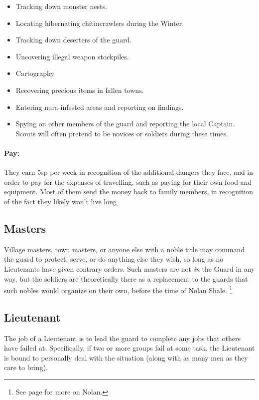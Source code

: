 \begin{multicols}{2}
\begin{itemize}
  \item
  Tracking down monster nests.
  \item
  Locating hibernating chitincrawlers during the Winter.
  \item
  Tracking down deserters of the \gls{guard}.
  \item
  Uncovering illegal weapon stockpiles.
  \item
  Cartography
  \item
  Recovering precious items in fallen towns.
  \item
  Entering nura-infested areas and reporting on findings.
  \item
  Spying on other members of the \gls{guard} and reporting the local Captain.
  Scouts will often pretend to be novices or soldiers during these times.
\end{itemize}

\paragraph{Pay:}
They earn 5sp per week in recognition of the additional dangers they face, and in order to pay for the expenses of travelling, such as paying for their own food and equipment.
Most of them send the money back to family members, in recognition of the fact they likely won't live long.

\subsection{Masters}

Village masters, town masters, or anyone else with a noble title may command the \gls{guard} to protect, serve, or do anything else they wish, so long as no Lieutenants have given contrary orders.
Such masters are not \textit{in} the Guard in any way, but the soldiers are theoretically there as a replacement to the guards that such nobles would organize on their own, before the time of Nolan Shale.%
\footnote{See page \pageref{nolan} for more on Nolan.}

\subsection{Lieutenant}

The job of a Lieutenant is to lead the \gls{guard} to complete any jobs that others have failed at.
Specifically, if two or more groups fail at some task, the Lieutenant is bound to personally deal with the situation (along with as many men as they care to bring).


\end{multicols}
